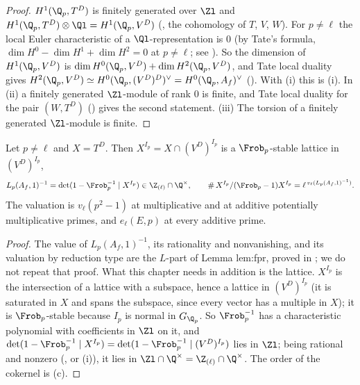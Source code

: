 \begin{proof}
$H^1(\Q_p,T^D)$ is finitely generated over $\Zl$ and $H^1(\Q_p,T^D)\otimes\Ql=H^1(\Q_p,V^D)$ (, the cohomology of $T$, $V$, $W$). For $p\ne\ell$ the local Euler
characteristic of a $\Ql$-representation is $0$ (by Tate's formula, $\dim H^0-\dim H^1+\dim H^2=0$ at $p\ne\ell$; see ). So the dimension of
$H^1(\Q_p,V^D)$ is $\dim H^0(\Q_p,V^D)+\dim H^2(\Q_p,V^D)$, and Tate local duality gives
$H^2(\Q_p,V^D)\simeq H^0(\Q_p,(V^D)^D)^\vee=H^0(\Q_p,A_f)^\vee$ (). With (i) this is (i). In (ii) a finitely
generated $\Zl$-module of rank $0$ is finite, and Tate local duality for the pair $(W,T^D)$ () gives the second statement. (iii) The torsion
of a finitely generated $\Zl$-module is finite.
\end{proof}

\begin{lemma}\label{lem:blochkato:euler-integral}
Let $p\ne\ell$ and $X=T^D$. Then $X^{I_p}=X\cap(V^D)^{I_p}$ is a $\Frob_p$-stable lattice in $(V^D)^{I_p}$,
\[
L_p(A_f,1)^{-1}=\det(1-\Frob_p^{-1}\mid X^{I_p})\in\Z_{(\ell)}\cap\Q^\times,\qquad\#\,X^{I_p}/(\Frob_p-1)X^{I_p}=\ell^{\,v_\ell(L_p(A_f,1)^{-1})}.
\]
The valuation is $v_\ell(p^2-1)$ at multiplicative and at additive potentially multiplicative primes, and $e_\ell(E,p)$ at every additive prime.
\end{lemma}

\begin{proof}
The value of $L_p(A_f,1)^{-1}$, its rationality and nonvanishing, and its valuation by reduction type are the $L$-part of Lemma lem:fpr, proved in
; we do not repeat that proof. What this chapter needs in addition is the lattice. $X^{I_p}$ is the intersection of a lattice with a subspace, hence
a lattice in $(V^D)^{I_p}$ (it is saturated in $X$ and spans the subspace, since every vector has a multiple in $X$); it is $\Frob_p$-stable because $I_p$ is normal in
$G_{\Q_p}$. So $\Frob_p^{-1}$ has a characteristic polynomial with coefficients in $\Zl$ on it, and $\det(1-\Frob_p^{-1}\mid X^{I_p})=\det(1-\Frob_p^{-1}\mid(V^D)^{I_p})$ lies
in $\Zl$; being rational and nonzero (, or (i)), it lies in $\Zl\cap\Q^\times=\Z_{(\ell)}\cap\Q^\times$. The order of
the cokernel is (c).
\end{proof}

